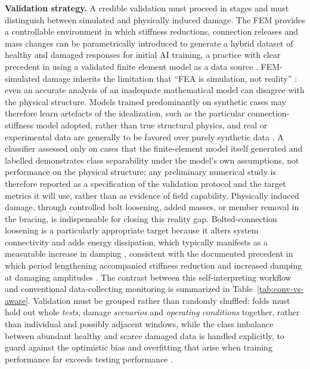 \textbf{Validation strategy.} A credible validation must proceed in stages and must distinguish between simulated and physically induced damage. The FEM provides a controllable environment in which stiffness reductions, connection releases and mass changes can be parametrically introduced to generate a hybrid dataset of healthy and damaged responses for initial AI training, a practice with clear precedent in using a validated finite element model as a data source \citep{naser2023ml}. FEM-simulated damage inherits the limitation that ``FEA is simulation, not reality'' \citep{cook2002fea}: even an accurate analysis of an inadequate mathematical model can disagree with the physical structure. Models trained predominantly on synthetic cases may therefore learn artefacts of the idealization, such as the particular connection-stiffness model adopted, rather than true structural physics, and real or experimental data are generally to be favored over purely synthetic data \citep{naser2023ml}. A classifier assessed only on cases that the finite-element model itself generated and labelled demonstrates class separability under the model's own assumptions, not performance on the physical structure; any preliminary numerical study is therefore reported as a specification of the validation protocol and the target metrics it will use, rather than as evidence of field capability. Physically induced damage, through controlled bolt loosening, added masses, or member removal in the bracing, is indispensable for closing this reality gap. Bolted-connection loosening is a particularly appropriate target because it alters system connectivity and adds energy dissipation, which typically manifests as a measurable increase in damping \citep{farrar2013shm,razi2013bolted,chelimilla2023looseness}, consistent with the documented precedent in which period lengthening accompanied stiffness reduction and increased damping at damaging amplitudes \citep{chopra2017dynamics}. The contrast between this self-interpreting workflow and conventional data-collecting monitoring is summarized in Table~\ref{tab:conv-vs-aware}. Validation must be grouped rather than randomly shuffled: folds must hold out whole \textit{tests}, damage \textit{scenarios} and \textit{operating conditions} together, rather than individual and possibly adjacent windows, while the class imbalance between abundant healthy and scarce damaged data is handled explicitly, to guard against the optimistic bias and overfitting that arise when training performance far exceeds testing performance \citep{naser2023ml,figueiredo2010machine}.

